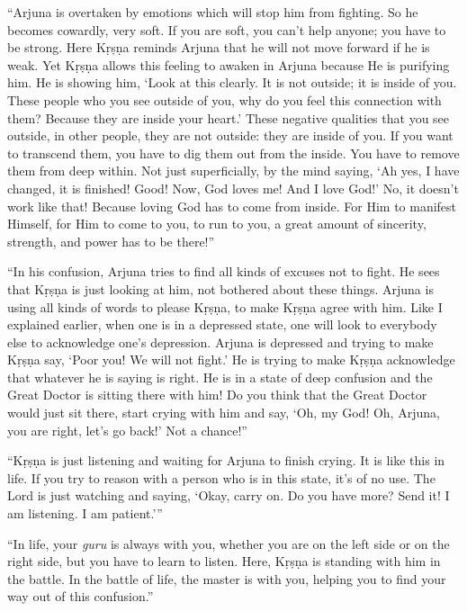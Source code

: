 \enquote{Arjuna is overtaken by emotions which will stop him from fighting. So he becomes cowardly, very soft. If you are soft, you can’t help anyone; you have to be strong. Here Kṛṣṇa reminds Arjuna that he will not move forward if he is weak. Yet Kṛṣṇa allows this feeling to awaken in Arjuna because He is purifying him. He is showing him, \enquote{Look at this clearly. It is not outside; it is inside of you. These people who you see outside of you, why do you feel this connection with them? Because they are inside your heart.} These negative qualities that you see outside, in other people, they are not outside: they are inside of you. If you want to transcend them, you have to dig them out from the inside. You have to remove them from deep within. Not just superficially, by the mind saying, \enquote{Ah yes, I have changed, it is finished! Good! Now, God loves me! And I love God!} No, it doesn’t work like that! Because loving God has to come from inside. For Him to manifest Himself, for Him to come to you, to run to you, a great amount of sincerity, strength, and power has to be there!}

\enquote{In his confusion, Arjuna tries to find all kinds of excuses not to fight. He sees that Kṛṣṇa is just looking at him, not bothered about these things. Arjuna is using all kinds of words to please Kṛṣṇa, to make Kṛṣṇa agree with him. Like I explained earlier, when one is in a depressed state, one will look to everybody else to acknowledge one’s depression. Arjuna is depressed and trying to make Kṛṣṇa say, \enquote{Poor you! We will not fight.} He is trying to make Kṛṣṇa acknowledge that whatever he is saying is right. He is in a state of deep confusion and the Great Doctor is sitting there with him! Do you think that the Great Doctor would just sit there, start crying with him and say, \enquote{Oh, my God! Oh, Arjuna, you are right, let’s go back!} Not a chance!}

\enquote{Kṛṣṇa is just listening and waiting for Arjuna to finish crying. It is like this in life. If you try to reason with a person who is in this state, it’s of no use. The Lord is just watching and saying, \enquote{Okay, carry on. Do you have more? Send it! I am listening. I am patient.}}

\enquote{In life, your \textit{guru} is always with you, whether you are on the left side or on the right side, but you have to learn to listen. Here, Kṛṣṇa is standing with him in the battle. In the battle of life, the master is with you, helping you to find your way out of this confusion.}

